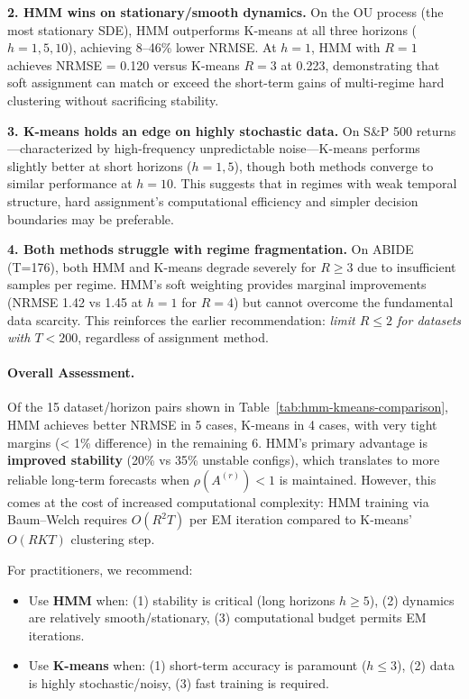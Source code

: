 \documentclass[journal, onecolumn]{IEEEtran}
\begin{document}
\textbf{2. HMM wins on stationary/smooth dynamics.}
On the OU process (the most stationary SDE), HMM outperforms K-means at all three horizons ($h=1,5,10$), achieving 8--46\% lower NRMSE. At $h=1$, HMM with $R=1$ achieves NRMSE = 0.120 versus K-means $R=3$ at 0.223, demonstrating that soft assignment can match or exceed the short-term gains of multi-regime hard clustering without sacrificing stability.

\textbf{3. K-means holds an edge on highly stochastic data.}
On S\&P 500 returns---characterized by high-frequency unpredictable noise---K-means performs slightly better at short horizons ($h=1, 5$), though both methods converge to similar performance at $h=10$. This suggests that in regimes with weak temporal structure, hard assignment's computational efficiency and simpler decision boundaries may be preferable.

\textbf{4. Both methods struggle with regime fragmentation.}
On ABIDE (T=176), both HMM and K-means degrade severely for $R \ge 3$ due to insufficient samples per regime. HMM's soft weighting provides marginal improvements (NRMSE 1.42 vs 1.45 at $h=1$ for $R=4$) but cannot overcome the fundamental data scarcity. This reinforces the earlier recommendation: \emph{limit $R \le 2$ for datasets with $T < 200$}, regardless of assignment method.

\paragraph{Overall Assessment.}
Of the 15 dataset/horizon pairs shown in Table~\ref{tab:hmm-kmeans-comparison}, HMM achieves better NRMSE in 5 cases, K-means in 4 cases, with very tight margins (< 1\% difference) in the remaining 6. HMM's primary advantage is \textbf{improved stability} (20\% vs 35\% unstable configs), which translates to more reliable long-term forecasts when $\rho(A^{(r)}) < 1$ is maintained. However, this comes at the cost of increased computational complexity: HMM training via Baum--Welch requires $O(R^2 T)$ per EM iteration compared to K-means' $O(RKT)$ clustering step.

For practitioners, we recommend:
\begin{itemize}
    \item Use \textbf{HMM} when: (1) stability is critical (long horizons $h \ge 5$), (2) dynamics are relatively smooth/stationary, (3) computational budget permits EM iterations.
    \item Use \textbf{K-means} when: (1) short-term accuracy is paramount ($h \le 3$), (2) data is highly stochastic/noisy, (3) fast training is required.
\end{itemize}
\end{document}
